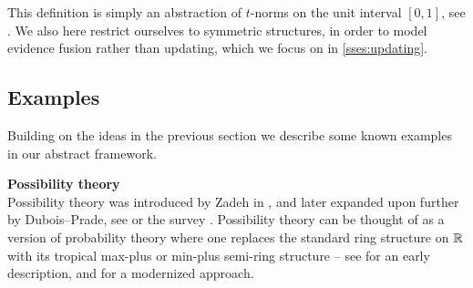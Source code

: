 \begin{remark}
    This definition is simply an abstraction of $t$-norms on the unit interval $[0,1]$, see \cite{klement-mesiar-pap_2000}. We also here restrict ourselves to symmetric structures, in order to model evidence fusion rather than updating, which we focus on in \cref{sses:updating}. 
\end{remark}




\subsection{Examples}
Building on the ideas in the previous section we describe some known examples in our abstract framework. 





\textbf{Possibility theory} \\
Possibility theory was introduced by Zadeh in \cite{zadeh_1978}, and later expanded upon further by Dubois--Prade, see \cite{dubois-prade_1988} or the survey \cite{dubois-prade_2015}. Possibility theory can be thought of as a version of probability theory where one replaces the standard ring structure on $\mathbb{R}$ with its tropical max-plus or min-plus semi-ring structure -- see \cite{green_1979} for an early description, and \cite{pin_1998} for a modernized approach. 

